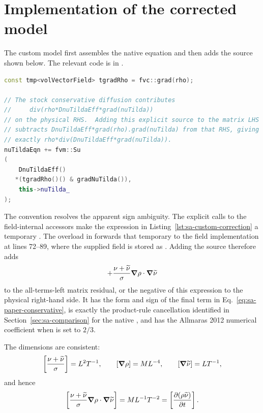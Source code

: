 \clearpage
\section{Implementation of the corrected model}
\label{sec:sa-correction}

The custom model first assembles the native equation and then adds the source
shown below.  The relevant code is in
.
\begin{lstlisting}[style=SAFoam,language=C++,firstnumber=54,
  caption={Density-gradient source in SpalartAllmarasDensityCorrected.},
  label={lst:sa-custom-correction}]
const tmp<volVectorField> tgradRho = fvc::grad(rho);

// The stock conservative diffusion contributes
//     div(rho*DnuTildaEff*grad(nuTilda))
// on the physical RHS.  Adding this explicit source to the matrix LHS
// subtracts DnuTildaEff*grad(rho).grad(nuTilda) from that RHS, giving
// exactly rho*div(DnuTildaEff*grad(nuTilda)).
nuTildaEqn += fvm::Su
(
    DnuTildaEff()
   *(tgradRho()() & gradNuTilda()),
    this->nuTilda_
);
\end{lstlisting}

The  convention resolves the apparent sign ambiguity.  The
explicit calls to the field-internal accessors make the expression in
Listing~\ref{lst:sa-custom-correction} a temporary
.  The overload in 
forwards that temporary to the field implementation at lines 72--89, where the
supplied field is stored as .  Adding the
source therefore adds
\begin{equation}
  +\frac{\nu+\widetilde{\nu}}{\sigma}
  \boldsymbol{\nabla}\rho\mathbin{\cdot}\boldsymbol{\nabla}\widetilde{\nu}
  \label{eq:sa-custom-residual-source}
\end{equation}
to the all-terms-left matrix residual, or the negative of this expression to
the physical right-hand side.  It has the form and sign of the final term in
Eq.~\eqref{eq:sa-paper-conservative}, is exactly the product-rule cancellation
identified in Section~\ref{sec:sa-comparison} for the native
, and has the Allmaras 2012 numerical coefficient when
 is set to \(2/3\).

The dimensions are consistent:
\begin{equation}
  \left[\frac{\nu+\widetilde{\nu}}{\sigma}\right]=L^2T^{-1},
  \qquad
  [\boldsymbol{\nabla}\rho]=ML^{-4},
  \qquad
  [\boldsymbol{\nabla}\widetilde{\nu}]=LT^{-1},
  \label{eq:sa-custom-source-factors-dimensions}
\end{equation}
and hence
\begin{equation}
  \left[
    \frac{\nu+\widetilde{\nu}}{\sigma}
    \boldsymbol{\nabla}\rho\mathbin{\cdot}\boldsymbol{\nabla}\widetilde{\nu}
  \right]
  =ML^{-1}T^{-2}
  =\left[\frac{\partial(\rho\widetilde{\nu})}{\partial t}\right].
  \label{eq:sa-custom-source-dimensions}
\end{equation}

